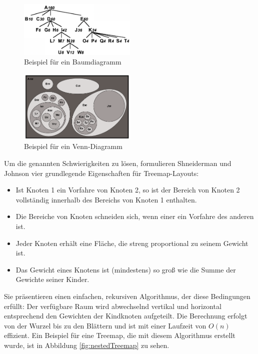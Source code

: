 \begin{figure}[ht]
    \centering
    \includegraphics[width=0.5\textwidth]{images/treediagram.png}
    \caption{Beispiel für ein Baumdiagramm}
    \label{fig:baumdiagramm}
\end{figure}

\begin{figure}[ht]
    \centering
    \includegraphics[width=0.5\textwidth]{images/verdiagram.png}
    \caption{Beispiel für ein Venn-Diagramm}
    \label{fig:venndiagram}
\end{figure}

Um die genannten Schwierigkeiten zu lösen, formulieren Shneiderman und Johnson vier grundlegende Eigenschaften für Treemap-Layouts:
\begin{itemize}
    \item Ist Knoten 1 ein Vorfahre von Knoten 2, so ist der Bereich von Knoten 2 vollständig innerhalb des Bereichs von Knoten 1 enthalten.
    \item Die Bereiche von Knoten schneiden sich, wenn einer ein Vorfahre des anderen ist.
    \item Jeder Knoten erhält eine Fläche, die streng proportional zu seinem Gewicht ist.
    \item Das Gewicht eines Knotens ist (mindestens) so groß wie die Summe der Gewichte seiner Kinder.
\end{itemize}

Sie präsentieren einen einfachen, rekursiven Algorithmus, der diese Bedingungen erfüllt: Der verfügbare Raum wird abwechselnd vertikal und horizontal entsprechend den Gewichten der Kindknoten aufgeteilt. Die Berechnung erfolgt von der Wurzel bis zu den Blättern und ist mit einer Laufzeit von $O(n)$ effizient. Ein Beispiel für eine Treemap, die mit diesem Algorithmus erstellt wurde, ist in Abbildung \ref{fig:nestedTreemap} zu sehen.

